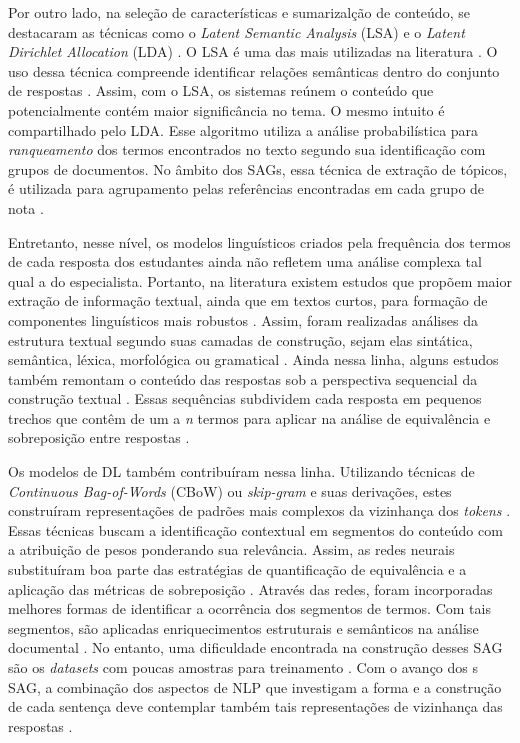 Por outro lado, na seleção de características e sumarizalção de conteúdo, se destacaram as técnicas como o \textit{Latent Semantic Analysis} (LSA) \cite{landauer1998} e o \textit{Latent Dirichlet Allocation} (LDA) \cite{blei2003}. O LSA é uma das mais utilizadas na literatura \cite{basu2013, sahu2020}. O uso dessa técnica compreende identificar relações semânticas dentro do conjunto de respostas \cite{mohler2009}. Assim, com o LSA, os sistemas reúnem o conteúdo que potencialmente contém maior significância no tema. O mesmo intuito é compartilhado pelo LDA. Esse algoritmo utiliza a análise probabilística para \textit{ranqueamento} dos termos encontrados no texto segundo sua identificação com grupos de documentos. No âmbito dos SAGs, essa técnica de extração de tópicos, é utilizada para agrupamento pelas referências encontradas em cada grupo de nota \cite{basu2013, zhang2022}.

Entretanto, nesse nível, os modelos linguísticos criados pela frequência dos termos de cada resposta dos estudantes ainda não refletem uma análise complexa tal qual a do especialista. Portanto, na literatura existem estudos que propõem maior extração de informação textual, ainda que em textos curtos, para formação de componentes linguísticos mais robustos \cite{saha2018, zesch2018}. Assim, foram realizadas análises da estrutura textual segundo suas camadas de construção, sejam elas sintática, semântica, léxica, morfológica ou gramatical \cite{ramachandran2015b, roy2016}. Ainda nessa linha, alguns estudos também remontam o conteúdo das respostas sob a perspectiva sequencial da construção textual \cite{kumar2017}. Essas sequências subdividem cada resposta em pequenos trechos que contêm de um a \textit{n} termos para aplicar na análise de equivalência e sobreposição entre respostas \cite{jimenez2013, sakaguchi2015, sultan2016}.

Os modelos de DL também contribuíram nessa linha. Utilizando técnicas de \textit{Continuous Bag-of-Words} (CBoW) ou \textit{skip-gram} e suas derivações, estes construíram representações de padrões mais complexos da vizinhança dos \textit{tokens} \cite{mikolov2013}. Essas técnicas buscam a identificação contextual em segmentos do conteúdo com a atribuição de pesos ponderando sua relevância. Assim, as redes neurais substituíram boa parte das estratégias de quantificação de equivalência e a aplicação das métricas de sobreposição \cite{haller2022}. Através das redes, foram incorporadas melhores formas de identificar a ocorrência dos segmentos de termos. Com tais segmentos, são aplicadas enriquecimentos estruturais e semânticos na análise documental \cite{camus2020}. No entanto, uma dificuldade encontrada na construção desses SAG são os \textit{datasets} com poucas amostras para treinamento \cite{bonthu2021}. Com o avanço dos s SAG, a combinação dos aspectos de NLP que investigam a forma e a construção de cada sentença deve contemplar também tais representações de vizinhança das respostas \cite{riordan2019, kumar2019}.


